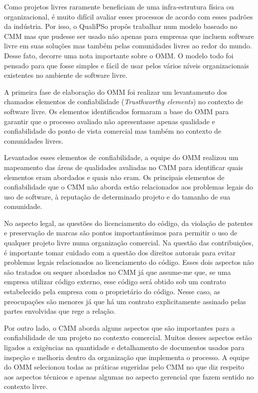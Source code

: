 Como projetos livres raramente beneficiam de uma infra-estrutura
física ou organizacional, é muito difícil avaliar esses processos de
acordo com esses padrões da indústria. Por isso, o QualiPSo propôs
trabalhar num modelo baseado no CMM mas que pudesse ser usado não
apenas para empresas que incluem software livre em suas soluções mas
também pelas comunidades livres ao redor do mundo. Desse fato, decorre
uma nota importante sobre o OMM. O modelo todo foi pensado para que
fosse simples e fácil de usar pelos vários níveis organizacionais
existentes no ambiente de software livre.

A primeira fase de elaboração do OMM foi realizar um levantamento dos
chamados elementos de confiabilidade (\textit{Trusthworthy elements})
no contexto de software livre. Os elementos identificados formaram a
base do OMM para garantir que o processo avaliado não apresentasse
apenas qualidade e confiabilidade do ponto de vista comercial mas
também no contexto de comunidades livres.

Levantados esses elementos de confiabilidade, a equipe do OMM realizou
um mapeamento das áreas de qualidades avaliadas no CMM para
identificar quais elementos eram abordados e quais não eram. Os
principais elementos de confiabilidade que o CMM não aborda estão
relacionados aos problemas legais do uso de software, à reputação de
determinado projeto e do tamanho de sua comunidade.

No aspecto legal, as questões do licenciamento do código, da violação
de patentes e preservação de marcas são pontos importantíssimos para
permitir o uso de qualquer projeto livre numa organização
comercial. Na questão das contribuições, é importante tomar cuidado
com a questão dos direitos autorais para evitar problemas legais
relacionados ao licenciamento do código. Esses dois aspectos não são
tratados ou sequer abordados no CMM já que assume-me que, se uma
empresa utilizar código externo, esse código será obtido sob um
contrato estabelecido pela empresa com o proprietário do código. Nesse
caso, as preocupações são menores já que há um contrato explicitamente
assinado pelas partes envolvidas que rege a relação.

Por outro lado, o CMM aborda alguns aspectos que são importantes para
a confiabilidade de um projeto no contexto comercial. Muitos desses
aspectos estão ligados a exigências na quantidade e detalhamento de
documentos usados para inspeção e melhoria dentro da organização que
implementa o processo. A equipe do OMM selecionou todas as práticas
sugeridas pelo CMM no que diz respeito aos aspectos técnicos e apenas
algumas no aspecto gerencial que fazem sentido no contexto livre.

